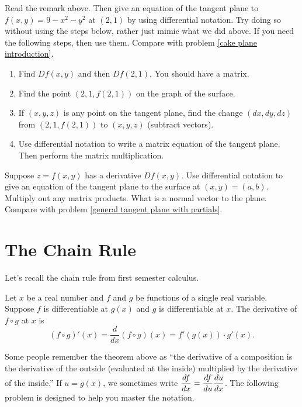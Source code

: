 \begin{problem}
Read the remark above. Then give an equation of the tangent plane to $f(x,y)=9-x^2-y^2$ at $(2,1)$ by using differential notation. Try doing so without using the steps below, rather just mimic what we did above. If you need the following steps, then use them. Compare with problem \ref{cake plane introduction}.
\begin{enumerate}
 \item Find $Df(x,y)$ and then $Df(2,1)$. You should have a matrix.
 \item Find the point $(2,1,f(2,1))$ on the graph of the surface.
 \item If $(x,y,z)$ is any point on the tangent plane, find the change $(dx,dy,dz)$ from $(2,1, f(2,1))$ to $(x,y,z)$ (subtract vectors).
 \item Use differential notation to write a matrix equation of the tangent plane. Then perform the matrix multiplication.
\end{enumerate}
\end{problem}

\begin{problem}
  Suppose $z=f(x,y)$ has a derivative $Df(x,y)$. Use differential notation to give an equation of the tangent plane to the surface at $(x,y)=(a,b)$. Multiply out any matrix products. What is a normal vector to the plane. Compare with problem \ref{general tangent plane with partials}.
\end{problem}

\section{The Chain Rule}

Let's recall the chain rule from first semester calculus. 

\begin{theorem}
 Let $x$ be a real number and $f$ and $g$ be functions of a single real variable. Suppose $f$ is differentiable at $g(x)$ and $g$ is differentiable at $x$. The derivative of $f\circ g$ at $x$ is 
$$(f\circ g)'(x) = \frac{d}{dx}(f\circ g)(x) = f'(g(x))\cdot g'(x).$$
\end{theorem}

Some people remember the theorem above as ``the derivative of a composition is the derivative of the outside (evaluated at the inside) multiplied by the derivative of the inside.'' If $u=g(x)$, we sometimes write $\displaystyle \frac{df}{dx}=\frac{df}{du}\frac{du}{dx}$. The following problem is designed to help you master the notation.


